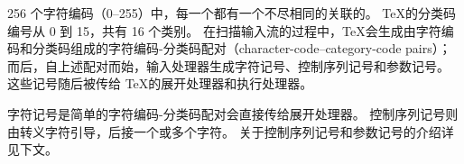 \documentclass{book}
\begin{document}
256 个字符编码（0--255）中，每一个都有一个不尽相同的关联的。
\TeX 的分类码编号从 0 到 15，共有 16 个类别。
在扫描输入流的过程中，\TeX 会生成由字符编码和分类码组成的字符编码-分类码配对（character-code--category-code pairs）；
而后，自上述配对而始，输入处理器生成字符记号、控制序列记号和参数记号。
这些记号随后被传给 \TeX 的展开处理器和执行处理器。

字符记号是简单的字符编码-分类码配对会直接传给展开处理器。
控制序列记号则由转义字符引导，后接一个或多个字符。
关于控制序列记号和参数记号的介绍详见下文。
\end{document}
